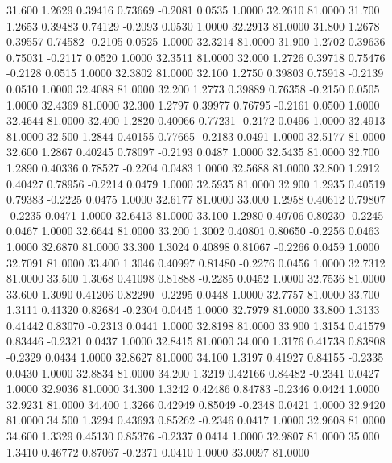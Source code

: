   31.600   1.2629   0.39416   0.73669  -0.2081   0.0535   1.0000  32.2610  81.0000
  31.700   1.2653   0.39483   0.74129  -0.2093   0.0530   1.0000  32.2913  81.0000
  31.800   1.2678   0.39557   0.74582  -0.2105   0.0525   1.0000  32.3214  81.0000
  31.900   1.2702   0.39636   0.75031  -0.2117   0.0520   1.0000  32.3511  81.0000
  32.000   1.2726   0.39718   0.75476  -0.2128   0.0515   1.0000  32.3802  81.0000
  32.100   1.2750   0.39803   0.75918  -0.2139   0.0510   1.0000  32.4088  81.0000
  32.200   1.2773   0.39889   0.76358  -0.2150   0.0505   1.0000  32.4369  81.0000
  32.300   1.2797   0.39977   0.76795  -0.2161   0.0500   1.0000  32.4644  81.0000
  32.400   1.2820   0.40066   0.77231  -0.2172   0.0496   1.0000  32.4913  81.0000
  32.500   1.2844   0.40155   0.77665  -0.2183   0.0491   1.0000  32.5177  81.0000
  32.600   1.2867   0.40245   0.78097  -0.2193   0.0487   1.0000  32.5435  81.0000
  32.700   1.2890   0.40336   0.78527  -0.2204   0.0483   1.0000  32.5688  81.0000
  32.800   1.2912   0.40427   0.78956  -0.2214   0.0479   1.0000  32.5935  81.0000
  32.900   1.2935   0.40519   0.79383  -0.2225   0.0475   1.0000  32.6177  81.0000
  33.000   1.2958   0.40612   0.79807  -0.2235   0.0471   1.0000  32.6413  81.0000
  33.100   1.2980   0.40706   0.80230  -0.2245   0.0467   1.0000  32.6644  81.0000
  33.200   1.3002   0.40801   0.80650  -0.2256   0.0463   1.0000  32.6870  81.0000
  33.300   1.3024   0.40898   0.81067  -0.2266   0.0459   1.0000  32.7091  81.0000
  33.400   1.3046   0.40997   0.81480  -0.2276   0.0456   1.0000  32.7312  81.0000
  33.500   1.3068   0.41098   0.81888  -0.2285   0.0452   1.0000  32.7536  81.0000
  33.600   1.3090   0.41206   0.82290  -0.2295   0.0448   1.0000  32.7757  81.0000
  33.700   1.3111   0.41320   0.82684  -0.2304   0.0445   1.0000  32.7979  81.0000
  33.800   1.3133   0.41442   0.83070  -0.2313   0.0441   1.0000  32.8198  81.0000
  33.900   1.3154   0.41579   0.83446  -0.2321   0.0437   1.0000  32.8415  81.0000
  34.000   1.3176   0.41738   0.83808  -0.2329   0.0434   1.0000  32.8627  81.0000
  34.100   1.3197   0.41927   0.84155  -0.2335   0.0430   1.0000  32.8834  81.0000
  34.200   1.3219   0.42166   0.84482  -0.2341   0.0427   1.0000  32.9036  81.0000
  34.300   1.3242   0.42486   0.84783  -0.2346   0.0424   1.0000  32.9231  81.0000
  34.400   1.3266   0.42949   0.85049  -0.2348   0.0421   1.0000  32.9420  81.0000
  34.500   1.3294   0.43693   0.85262  -0.2346   0.0417   1.0000  32.9608  81.0000
  34.600   1.3329   0.45130   0.85376  -0.2337   0.0414   1.0000  32.9807  81.0000
  35.000   1.3410   0.46772   0.87067  -0.2371   0.0410   1.0000  33.0097  81.0000
